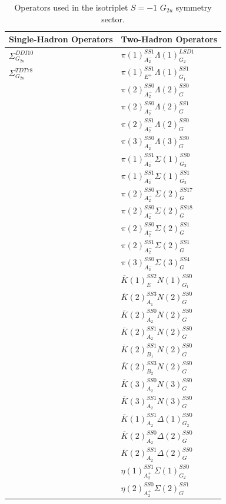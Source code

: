 \begin{table}[H]
    \centering
    \begin{tabular}{l|l}
        \textbf{Single-Hadron Operators} & \textbf{Two-Hadron Operators} \\
        \hline
        $\Sigma_{G_{2u}}^{DDI10}$ & $\pi(1)_{A_2^-}^{SS1}\Lambda(1)_{G_2}^{LSD1}$\\
        $\Sigma_{G_{2u}}^{TDT78}$ & $\pi(1)_{E^+}^{SS1}\Lambda(1)_{G_1}^{SS1}$\\
        & $\pi(2)_{A_2^-}^{SS0}\Lambda(2)_{G}^{SS0}$\\
        & $\pi(2)_{A_2^-}^{SS0}\Lambda(2)_{G}^{SS1}$\\
        & $\pi(2)_{A_2^-}^{SS1}\Lambda(2)_{G}^{SS0}$\\
        & $\pi(3)_{A_2^-}^{SS0}\Lambda(3)_{G}^{SS0}$\\
        & $\pi(1)_{A_2^-}^{SS1}\Sigma(1)_{G_2}^{SS0}$\\
        & $\pi(1)_{A_2^-}^{SS1}\Sigma(1)_{G_2}^{SS1}$\\
        & $\pi(2)_{A_2^-}^{SS0}\Sigma(2)_{G}^{SS17}$\\
        & $\pi(2)_{A_2^-}^{SS0}\Sigma(2)_{G}^{SS18}$\\
        & $\pi(2)_{A_2^-}^{SS0}\Sigma(2)_{G}^{SS1}$\\
        & $\pi(2)_{A_2^-}^{SS1}\Sigma(2)_{G}^{SS1}$\\
        & $\pi(3)_{A_2^-}^{SS0}\Sigma(3)_{G}^{SS4}$\\
        & $\overline K(1)_{E}^{SS2}N(1)_{G_1}^{SS0}$\\
        & $\overline K(2)_{A_1}^{SS3}N(2)_{G}^{SS0}$\\
        & $\overline K(2)_{A_2}^{SS0}N(2)_{G}^{SS0}$\\
        & $\overline K(2)_{A_2}^{SS1}N(2)_{G}^{SS0}$\\
        & $\overline K(2)_{B_1}^{SS1}N(2)_{G}^{SS0}$\\
        & $\overline K(2)_{B_2}^{SS3}N(2)_{G}^{SS0}$\\
        & $\overline K(3)_{A_2}^{SS0}N(3)_{G}^{SS0}$\\
        & $\overline K(3)_{A_2}^{SS1}N(3)_{G}^{SS0}$\\
        & $\overline K(1)_{A_2}^{SS1}\Delta(1)_{G_2}^{SS0}$\\
        & $\overline K(2)_{A_2}^{SS0}\Delta(2)_{G}^{SS0}$\\
        & $\overline K(2)_{A_2}^{SS1}\Delta(2)_{G}^{SS0}$\\
        & $\eta(1)_{A_2^+}^{SS1}\Sigma(1)_{G_2}^{SS0}$\\
        & $\eta(2)_{A_2^+}^{SS0}\Sigma(2)_{G}^{SS1}$    
    \end{tabular}
    \caption{Operators used in the isotriplet $S=-1$ $G_{2u}$ symmetry sector.}\label{table:g2u_ops}
\end{table}
\renewcommand{\arraystretch}{1.5}

